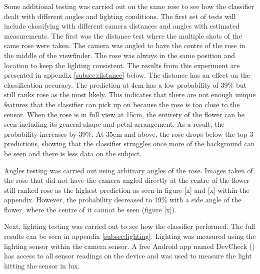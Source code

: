 \documentclass{article}
\begin{document}
Some additional testing was carried out on the same rose to see how the classifier dealt with different angles and 
lighting conditions. The first set of tests will include classifying with different camera distances and angles with 
estimated measurements. The first was the distance test where the multiple shots of the same rose were taken. The camera
was angled to have the centre of the rose in the middle of the viewfinder. The rose was always in the same position and 
location to keep the lighting consistent. The results from this experiment are presented in appendix 
\ref{subsec:distance} below. The distance has an effect on the classification accuracy. The prediction at 4cm has a low probability of 39\% but still
ranks rose as the most likely. This indicates that there are not enough unique features that the classifier can pick up 
on because the rose is too close to the sensor. When the rose is in full view at 15cm, the entirety of the flower can be
seen including its general shape and petal arrangement. As a result, the probability increases by 39\%. At 35cm 
and above, the rose drops below the top 3 predictions, showing that the classifier struggles once more of the 
background can be seen and there is less data on the subject.

\par

Angles testing was carried out using arbitrary angles of the rose. Images taken of the rose that did not have the camera
angled directly at the centre of the flower still ranked rose as the highest prediction as seen in figure [x] and 
[x] within the appendix. However, the probability decreased to 19\% with a side angle of the flower, where the centre of
it cannot be seen (figure [x]).

\par

Next, lighting testing was carried out to see how the classifier performed. The full results can be seen in appendix 
\ref{subsec:lighting}. Lighting was measured using the lighting 
sensor within the camera sensor. A free Android app named DevCheck (\cite{GooglePlayDevCheck}) has access to all sensor 
readings on the device and was used to measure the light hitting the sensor in lux.
\end{document}
